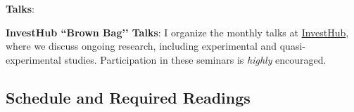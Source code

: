 \documentclass[letterpaper]{article}
\renewenvironment{itemize}{
  \begin{list}{}{
    \setlength{\leftmargin}{1.5em}
  }
}{
  \end{list}
}
\begin{document}
\begin{itemize}
\begin{itemize}
    \end{itemize} 


\item {\bf Talks}:

  \begin{itemize}
    \item[$\diamond$] {\bf InvestHub ``Brown Bag’’ Talks}: I organize the monthly talks at \href{https://invest.utu.fi/welfare-research-and-ecosystem/investhub/}{InvestHub}, where we discuss ongoing research, including experimental and quasi-experimental studies. Participation in these seminars is \emph{highly} encouraged.
  \end{itemize}

\end{itemize}


\subsection*{Schedule and Required Readings}
\end{document}
